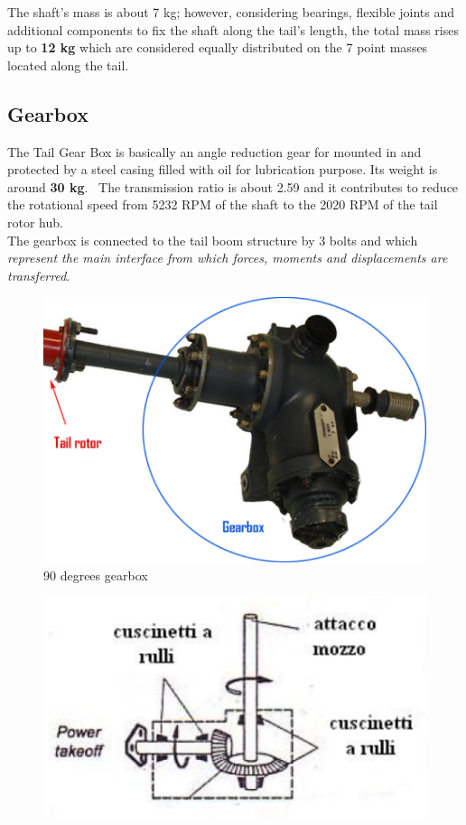 \noindent 
The shaft's mass is about 7 kg; however, considering bearings, flexible joints and additional components to fix the shaft along the tail's length, the total mass rises up to \textbf{12 kg} which are considered equally distributed on the 7 point masses located along the tail.
\clearpage
\subsection*{Gearbox}
\noindent
The Tail Gear Box is basically an angle reduction gear for mounted in and protected by a steel casing filled with oil for lubrication purpose. Its weight is around \textbf{30 kg}. \
The transmission ratio is about 2.59 and it contributes to reduce the rotational speed from 5232 RPM of the shaft to the 2020 RPM of the tail rotor hub. \\
The gearbox is connected to the tail boom structure by 3 bolts and which \emph{represent the main interface from which forces, moments and displacements are transferred}. \\

\smallskip
\begin{figure}[h!]
	\begin{center}
		\centering  		 		
		\includegraphics[width=0.8\linewidth]{PICTURES/2_Lama_truss/PNG/model2/gearbox}
	\end{center}
	\caption{90 degrees gearbox}
\end{figure}	

\medskip
\begin{figure}[h!]
	\begin{center}
		\centering  		 		
		\includegraphics[width=0.65\linewidth]{PICTURES/2_Lama_truss/PNG/gearbox_tail_scheme}
	\end{center}
\end{figure}	


